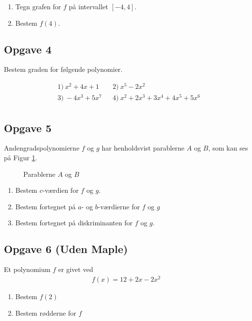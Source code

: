 \documentclass[12pt]{article}
\begin{document}
\begin{enumerate}[label=\roman*)]
	\item Tegn grafen for $f$ på intervallet $[-4,4]$.
	\item Bestem $f(4)$.
\end{enumerate}

\subsection*{Opgave 4}

Bestem graden for følgende polynomier.

\begin{align*}
	&1) \ x^2+4x+1   &&2) \ x^5-2x^2    \\
	&3) \ -4x^3+5x^7   &&4) \  x^2+2x^3+3x^4+4x^5+5x^6    \\
\end{align*}

\subsection*{Opgave 5}

Andengradspolynomierne $f$ og $g$ har henholdsvist parablerne $A$ og $B$, som kan ses på Figur \ref{fig:parabler}.
\begin{figure}[H]
	\centering
	\caption{Parablerne $A$ og $B$}
	\label{fig:parabler}
\end{figure}

\begin{enumerate}[label=\roman*)]
	\item Bestem $c$-værdien for $f$ og $g$.
	\item Bestem fortegnet på $a$- og $b$-værdierne for $f$ og $g$
	\item Bestem fortegnet på diskriminanten for $f$ og $g$.
\end{enumerate}

\subsection*{Opgave 6 (Uden Maple)}
Et polynomium $f$ er givet ved
\begin{align*}
	f(x) = 12 + 2 x - 2 x^2
\end{align*}
\begin{enumerate}[label=\roman*)]
	\item Bestem $f(2)$
	\item Bestem rødderne for $f$
\end{enumerate}
\end{document}

